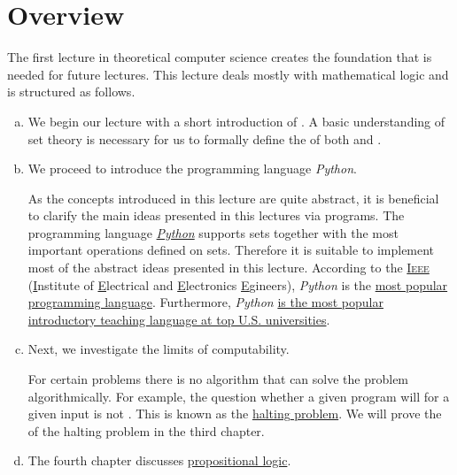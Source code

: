 \section{Overview} 
The first lecture in theoretical computer science creates the foundation that is needed for future lectures.
This lecture deals mostly with mathematical logic and is structured as follows.
\begin{enumerate}[(a)]
\item We begin our lecture with a short introduction of .  A basic understanding of set theory is
      necessary for us to formally define the  of both  and .
\item We proceed to introduce the programming language \textsl{Python}.

      As the concepts introduced in this lecture are quite abstract, it is beneficial to clarify the main
      ideas presented in this lectures via programs.  The programming language
      \href{http://python.org}{\textsl{Python}} supports sets together with the most important operations
      defined on sets.  Therefore it is
      suitable to implement most of the abstract ideas presented in this lecture.  According to the 
      \href{http://ieee.org}{\textsc{Ieee}} (\underline{I}nstitute of \underline{E}lectrical and
      \underline{E}lectronics \underline{E}gineers),  \textsl{Python} is the 
      \href{https://spectrum.ieee.org/top-programming-languages/}{most popular programming language}.
      Furthermore, \textsl{Python}
      \href{https://cacm.acm.org/blogs/blog-cacm/176450-python-is-now-the-most-popular-introductory-teaching-language-at-top-u-s-universities/fulltext}{is
        the most popular introductory teaching language at top U.S. universities}.
\item Next, we investigate the limits of computability.

      For certain problems there is no algorithm that can solve the problem algorithmically. 
      For example, the question whether a given program will  for a given input is not
      .  This is known as the \href{https://en.wikipedia.org/wiki/Halting_problem}{halting problem}.  
      We will prove the  of the halting problem in the third chapter. 
\item The fourth chapter discusses \href{https://en.wikipedia.org/wiki/Propositional_calculus}{propositional logic}.


\end{enumerate}
